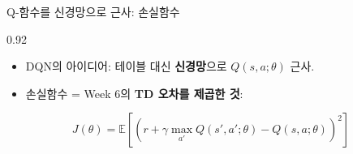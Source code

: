 \begin{frame}{Q-함수를 신경망으로 근사: 손실함수}
\begin{center}\begin{varwidth}{0.92\textwidth}
  \begin{itemize}
    \item DQN의 아이디어: 테이블 대신 \textbf{신경망}으로 $Q(s,a;\theta)$ 근사.
    \item 손실함수 = Week 6의 \textbf{TD 오차를 제곱한 것}:
  \end{itemize}
  \[
  J(\theta) = \mathbb{E}\left[\left(r + \gamma \max_{a'} Q(s',a';\theta)
  - Q(s,a;\theta)\right)^2\right]
  \]
\end{varwidth}\end{center}
\end{frame}
